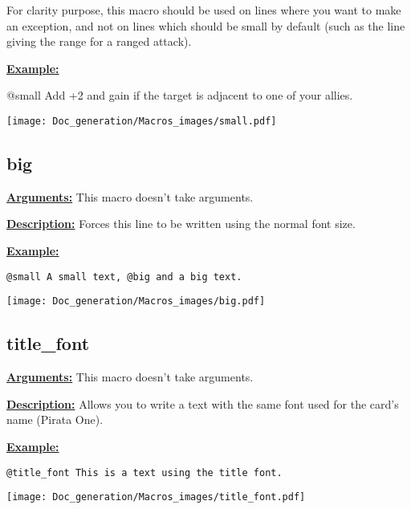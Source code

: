 \documentclass{article}
\begin{document}
For clarity purpose, this macro should be used on lines where you want to make an exception, and not on lines which should be small by default (such as the line giving the range for a ranged attack).

\textbf{\underline{Example:}}

\begin{spverbatim}
@small Add +2  and gain  if the target is adjacent to one of your allies.
\end{spverbatim}

\begin{center}
\texttt{[image: Doc\_generation/Macros\_images/small.pdf]}
\end{center}

\subsection{big}
\textbf{\underline{Arguments:}} This macro doesn't take arguments.

\textbf{\underline{Description:}} Forces this line to be written using the normal font size.

\textbf{\underline{Example:}}

\begin{center}
\begin{BVerbatim}
@small A small text, @big and a big text.
\end{BVerbatim}

\texttt{[image: Doc\_generation/Macros\_images/big.pdf]}
\end{center}


\subsection{title\_font}
\textbf{\underline{Arguments:}} This macro doesn't take arguments.

\textbf{\underline{Description:}} Allows you to write a text with the same font used for the card's name (Pirata One).

\textbf{\underline{Example:}}

\begin{center}
\begin{BVerbatim}
@title_font This is a text using the title font.
\end{BVerbatim}

\texttt{[image: Doc\_generation/Macros\_images/title\_font.pdf]}
\end{center}
\end{document}
